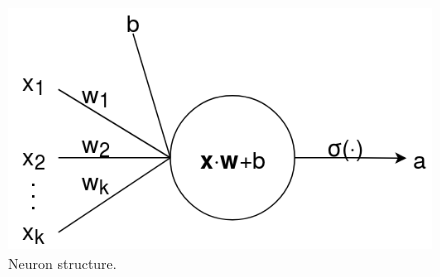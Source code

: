 \begin{figure}[ht]
	\centering
	\includegraphics[scale=0.5]{Images/3_neuron.png}
	\caption{Neuron structure.}
	\label{nnet-neuronfig}
\end{figure}


